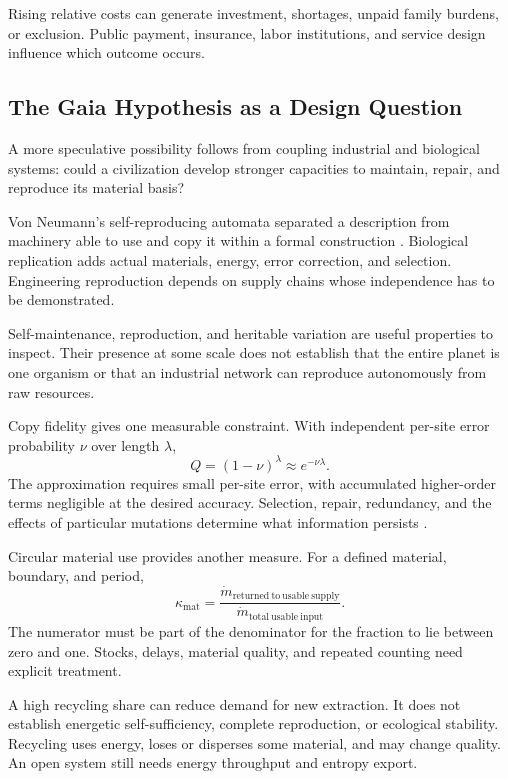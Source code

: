 Rising relative costs can generate investment, shortages, unpaid family burdens, or exclusion. Public payment, insurance, labor institutions, and service design influence which outcome occurs.

\subsection{The Gaia Hypothesis as a Design Question}

A more speculative possibility follows from coupling industrial and biological systems: could a civilization develop stronger capacities to maintain, repair, and reproduce its material basis?

Von Neumann's self-reproducing automata separated a description from machinery able to use and copy it within a formal construction \cite{vonneumann1966theory}. Biological replication adds actual materials, energy, error correction, and selection. Engineering reproduction depends on supply chains whose independence has to be demonstrated.

Self-maintenance, reproduction, and heritable variation are useful properties to inspect. Their presence at some scale does not establish that the entire planet is one organism or that an industrial network can reproduce autonomously from raw resources.

Copy fidelity gives one measurable constraint. With independent per-site error probability $\nu$ over length $\lambda$,
\begin{equation}
 Q=(1-\nu)^\lambda\approx e^{-\nu\lambda}.
\end{equation}
The approximation requires small per-site error, with accumulated higher-order terms negligible at the desired accuracy. Selection, repair, redundancy, and the effects of particular mutations determine what information persists \cite{kunkel2000dna,gilbert1986}.

Circular material use provides another measure. For a defined material, boundary, and period,
\begin{equation}
 \kappa_{\mathrm{mat}}=
 \frac{\dot m_{\mathrm{returned\ to\ usable\ supply}}}
      {\dot m_{\mathrm{total\ usable\ input}}}.
\end{equation}
The numerator must be part of the denominator for the fraction to lie between zero and one. Stocks, delays, material quality, and repeated counting need explicit treatment.

A high recycling share can reduce demand for new extraction. It does not establish energetic self-sufficiency, complete reproduction, or ecological stability. Recycling uses energy, loses or disperses some material, and may change quality. An open system still needs energy throughput and entropy export.

